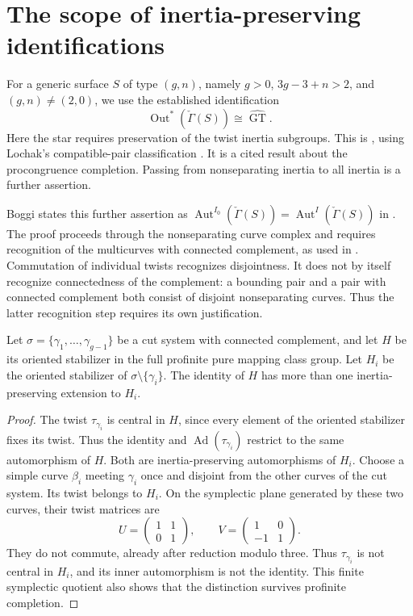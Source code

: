 \section{The scope of inertia-preserving identifications}
For a generic surface $S$ of type $(g,n)$, namely
$g>0$, $3g-3+n>2$, and $(g,n)\ne(2,0)$, we use the established
identification
\[
 \operatorname{Out}^{*}(\check\Gamma(S))
       \cong\widehat{\operatorname{GT}}.
\]
Here the star requires preservation of the twist inertia subgroups.
This is \cite[Corollary 22]{H17}, using Lochak's compatible-pair
classification \cite[Definition 5.4, Proposition--Definition 5.6,
and Theorem 5.10(ii)]{Lochak2025}. It is a cited result about the
procongruence completion. Passing from nonseparating inertia to all
inertia is a further assertion.

Boggi states this further assertion as
$\operatorname{Aut}^{I_0}(\check\Gamma(S))=
\operatorname{Aut}^{I}(\check\Gamma(S))$ in
\cite[Theorem 3.12 and Corollary 3.15]{Boggi}.
The proof proceeds through the nonseparating curve complex and requires
recognition of the multicurves with connected complement, as used in
\cite[Remark 3.11]{Boggi}. Commutation of individual twists recognizes
disjointness. It does not by itself recognize connectedness of the
complement: a bounding pair and a pair with connected complement both
consist of disjoint nonseparating curves. Thus the latter recognition
step requires its own justification.

\begin{proposition}\label{prop:nonunique-stabilizer-extension}
Let $\sigma=\{\gamma_1,\ldots,\gamma_{g-1}\}$ be a cut system with
connected complement, and let $H$ be its oriented stabilizer in the
full profinite pure mapping class group. Let $H_i$ be the oriented
stabilizer of $\sigma\setminus\{\gamma_i\}$. The identity
of $H$ has more than one inertia-preserving extension to $H_i$.
\end{proposition}
\begin{proof}
The twist $\tau_{\gamma_i}$ is central in $H$, since every element
of the oriented stabilizer fixes its twist. Thus the identity and
$\operatorname{Ad}(\tau_{\gamma_i})$ restrict to the same automorphism
of $H$. Both are inertia-preserving automorphisms of $H_i$.
Choose a simple curve $\beta_i$ meeting $\gamma_i$ once and disjoint
from the other curves of the cut system. Its twist belongs to $H_i$.
On the symplectic plane generated by these two curves, their twist
matrices are
\[
 U=\begin{pmatrix}1&1\\0&1\end{pmatrix},\qquad
 V=\begin{pmatrix}1&0\\-1&1\end{pmatrix}.
\]
They do not commute, already after reduction modulo three. Thus
$\tau_{\gamma_i}$ is not central in $H_i$, and its inner automorphism
is not the identity. This finite symplectic quotient also shows that
the distinction survives profinite completion.
\end{proof}

